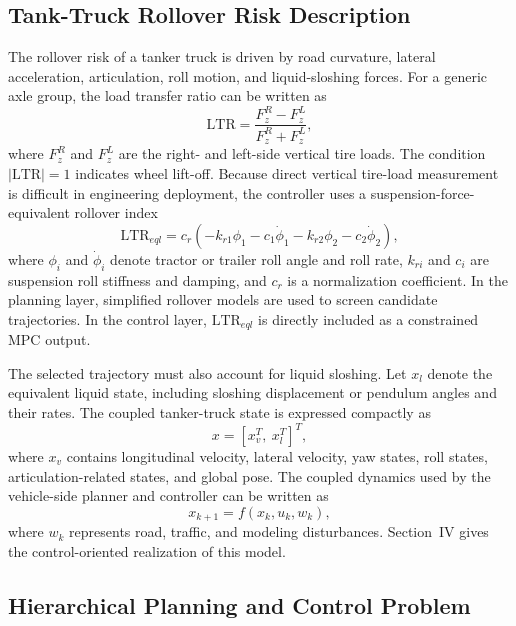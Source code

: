 \subsection{Tank-Truck Rollover Risk Description}

The rollover risk of a tanker truck is driven by road curvature, lateral acceleration, articulation, roll motion, and liquid-sloshing forces. For a generic axle group, the load transfer ratio can be written as
\begin{equation}
  \mathrm{LTR}=\frac{F_z^R-F_z^L}{F_z^R+F_z^L},
  \label{eq:ltr_definition}
\end{equation}
where $F_z^R$ and $F_z^L$ are the right- and left-side vertical tire loads. The condition $|\mathrm{LTR}|=1$ indicates wheel lift-off. Because direct vertical tire-load measurement is difficult in engineering deployment, the controller uses a suspension-force-equivalent rollover index
\begin{equation}
  \mathrm{LTR}_{eql}
  =c_r(-k_{r1}\phi_1-c_1\dot{\phi}_1-k_{r2}\phi_2-c_2\dot{\phi}_2),
  \label{eq:ltr_eql_problem}
\end{equation}
where $\phi_i$ and $\dot{\phi}_i$ denote tractor or trailer roll angle and roll rate, $k_{ri}$ and $c_i$ are suspension roll stiffness and damping, and $c_r$ is a normalization coefficient. In the planning layer, simplified rollover models are used to screen candidate trajectories. In the control layer, $\mathrm{LTR}_{eql}$ is directly included as a constrained MPC output.

The selected trajectory must also account for liquid sloshing. Let $x_l$ denote the equivalent liquid state, including sloshing displacement or pendulum angles and their rates. The coupled tanker-truck state is expressed compactly as
\begin{equation}
  x=[x_v^T,\ x_l^T]^T,
\end{equation}
where $x_v$ contains longitudinal velocity, lateral velocity, yaw states, roll states, articulation-related states, and global pose. The coupled dynamics used by the vehicle-side planner and controller can be written as
\begin{equation}
  x_{k+1}=f(x_k,u_k,w_k),
  \label{eq:coupled_compact}
\end{equation}
where $w_k$ represents road, traffic, and modeling disturbances. Section~IV gives the control-oriented realization of this model.

\subsection{Hierarchical Planning and Control Problem}

